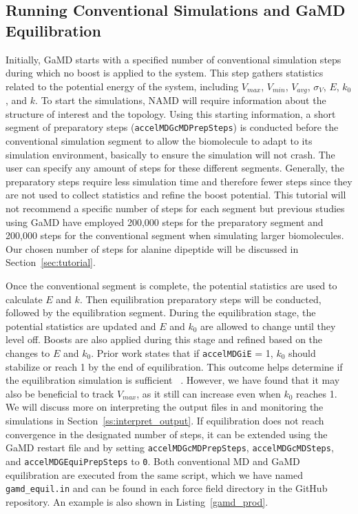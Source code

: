 \documentclass[9pt,tutorial,pubversion]{livecoms}
\begin{document}
\subsection{Running Conventional Simulations and GaMD Equilibration} \label{ss:cmd_gamd_equil}
Initially, GaMD starts with a specified number of conventional simulation steps during which no boost is applied to the system. This step gathers statistics related to the potential energy of the system, including $V_{max}$, $V_{min}$, $V_{avg}$, $\sigma_{V}$, $E$, $k_{0}$, and $k$. To start the simulations, NAMD will require information about the structure of interest and the topology. Using this starting information, a short segment of preparatory steps (\texttt{accelMDGcMDPrepSteps}) is conducted before the conventional simulation segment to allow the biomolecule to adapt to its simulation environment, basically to ensure the simulation will not crash. The user can specify any amount of steps for these different segments. Generally, the preparatory steps require less simulation time and therefore fewer steps since they are not used to collect statistics and refine the boost potential. This tutorial will not recommend a specific number of steps for each segment but previous studies using GaMD have employed 200,000 steps for the preparatory segment and 200,000 steps for the conventional segment when simulating larger biomolecules. Our chosen number of steps for alanine dipeptide will be discussed in Section~\ref{sec:tutorial}.

Once the conventional segment is complete, the potential statistics are used to calculate $E$ and $k$. Then equilibration preparatory steps will be conducted, followed by the equilibration segment. During the equilibration stage, the potential statistics are updated and $E$ and $k_{0}$ are allowed to change until they level off. Boosts are also applied during this stage and refined based on the changes to $E$ and $k_{0}$. Prior work states that if \texttt{accelMDGiE} = 1, $k_{0}$ should stabilize or reach 1 by the end of equilibration. This outcome helps determine if the equilibration simulation is sufficient ~\cite{miao_gaussian_2015}. However, we have found that it may also be beneficial to track $V_{max}$, as it still can increase even when $k_{0}$ reaches 1. We will discuss more on interpreting the output files in and monitoring the simulations in Section~\ref{ss:interpret_output}. If equilibration does not reach convergence in the designated number of steps, it can be extended using the GaMD restart file and by setting \texttt{accelMDGcMDPrepSteps}, \texttt{accelMDGcMDSteps}, and \texttt{accelMDGEquiPrepSteps} to \texttt{0}. Both conventional MD and GaMD equilibration are executed from the same script, which we have named \texttt{gamd\_equil.in} and can be found in each force field directory in the GitHub repository. An example is also shown in Listing~\ref{gamd_prod}.
\end{document}
